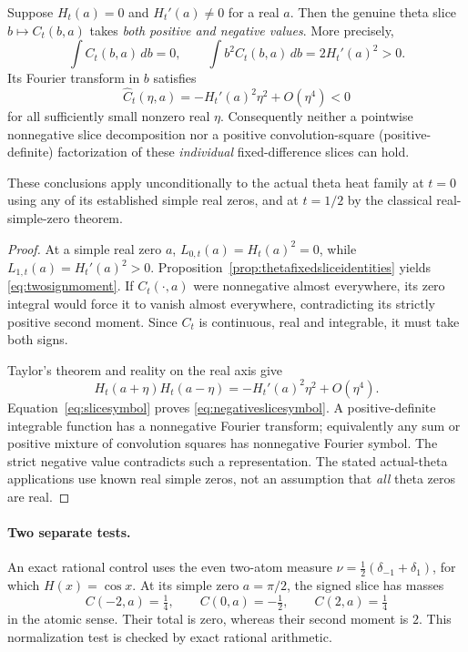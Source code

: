 \begin{theorem}\label{thm:thetaslicesign}
Suppose $H_t(a)=0$ and $H_t'(a)\ne0$
for a real $a$. Then the genuine theta
slice $b\mapsto C_t(b,a)$ takes
\emph{both positive and negative values}.
More precisely,
\begin{equation}
\int C_t(b,a)\,db=0,\qquad
\int b^2C_t(b,a)\,db=2H_t'(a)^2>0 .
\label{eq:twosignmoment}
\end{equation}
Its Fourier transform in $b$ satisfies
\begin{equation}
\widehat C_t(\eta,a)
= -H_t'(a)^2\eta^2+O(\eta^4)<0
\label{eq:negativeslicesymbol}
\end{equation}
for all sufficiently small nonzero real $\eta$.
Consequently neither a pointwise nonnegative
slice decomposition nor a positive
convolution-square (positive-definite)
factorization of these \emph{individual}
fixed-difference slices can hold.

These conclusions apply unconditionally
to the actual theta heat family at $t=0$
using any of its established simple real
zeros, and at $t=1/2$ by the classical
real-simple-zero theorem.
\end{theorem}
\begin{proof}
At a simple real zero $a$,
$L_{0,t}(a)=H_t(a)^2=0$, while
$L_{1,t}(a)=H_t'(a)^2>0$.
Proposition~\ref{prop:thetafixedsliceidentities}
yields \eqref{eq:twosignmoment}.
If $C_t(\cdot,a)$ were nonnegative
almost everywhere, its zero integral
would force it to vanish almost
everywhere, contradicting its strictly
positive second moment. Since $C_t$ is
continuous, real and integrable, it must
take both signs.

Taylor's theorem and reality on the real
axis give
\[
H_t(a+\eta)H_t(a-\eta)
=-H_t'(a)^2\eta^2+O(\eta^4).
\]
Equation~\eqref{eq:slicesymbol} proves
\eqref{eq:negativeslicesymbol}.
A positive-definite integrable function
has a nonnegative Fourier transform;
equivalently any sum or positive mixture
of convolution squares has nonnegative
Fourier symbol. The strict negative
value contradicts such a representation.
The stated actual-theta applications use
known real simple zeros, not an assumption
that \emph{all} theta zeros are real.
\end{proof}

\paragraph{Two separate tests.}
An exact rational control uses the
even two-atom measure
$\nu=\tfrac12(\delta_{-1}+\delta_1)$,
for which $H(x)=\cos x$.
At its simple zero $a=\pi/2$,
the signed slice has masses
\[
C(-2,a)=\tfrac14,\qquad
C(0,a)=-\tfrac12,\qquad
C(2,a)=\tfrac14
\]
in the atomic sense. Their total
is zero, whereas their second moment
is $2$. This normalization test is
checked by exact rational arithmetic.

